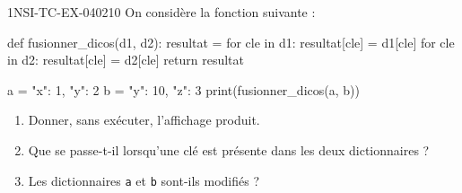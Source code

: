 \begin{exercice}{1NSI-TC-EX-040}{2}{10}
On considère la fonction suivante :
\begin{python}
def fusionner_dicos(d1, d2):
    resultat = {}
    for cle in d1:
        resultat[cle] = d1[cle]
    for cle in d2:
        resultat[cle] = d2[cle]
    return resultat

a = {"x": 1, "y": 2}
b = {"y": 10, "z": 3}
print(fusionner_dicos(a, b))
\end{python}
\begin{enumerate}
  \item Donner, sans exécuter, l'affichage produit.
  \item Que se passe-t-il lorsqu'une clé est présente dans les deux dictionnaires ?
  \item Les dictionnaires \lstinline{a} et \lstinline{b} sont-ils modifiés ?
\end{enumerate}
\end{exercice}
